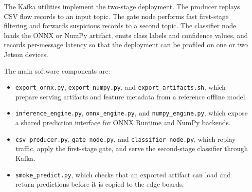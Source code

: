 The Kafka utilities implement the two-stage deployment. The producer replays CSV flow records to an input topic. The gate node performs fast first-stage filtering and forwards suspicious records to a second topic. The classifier node loads the ONNX or NumPy artifact, emits class labels and confidence values, and records per-message latency so that the deployment can be profiled on one or two Jetson devices.

The main software components are:
\begin{itemize}[leftmargin=1.4em]
  \item \texttt{export\_onnx.py}, \texttt{export\_numpy.py}, and \texttt{export\_artifacts.sh}, which prepare serving artifacts and feature metadata from a reference offline model.
  \item \texttt{inference\_engine.py}, \texttt{onnx\_engine.py}, and \texttt{numpy\_engine.py}, which expose a shared prediction interface for ONNX Runtime and NumPy backends.
  \item \texttt{csv\_producer.py}, \texttt{gate\_node.py}, and \texttt{classifier\_node.py}, which replay traffic, apply the first-stage gate, and serve the second-stage classifier through Kafka.
  \item \texttt{smoke\_predict.py}, which checks that an exported artifact can load and return predictions before it is copied to the edge boards.
\end{itemize}
